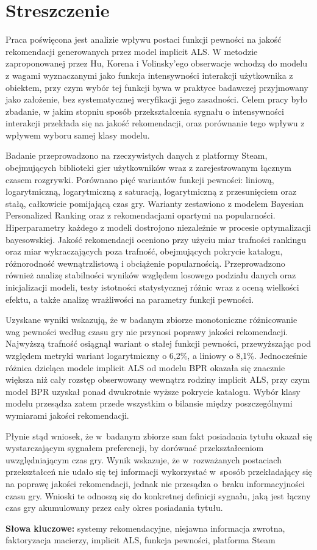 \chapter*{Streszczenie}

Praca poświęcona jest analizie wpływu postaci funkcji pewności na jakość rekomendacji generowanych przez model implicit ALS. W metodzie zaproponowanej przez Hu, Korena i Volinsky'ego obserwacje wchodzą do modelu z wagami wyznaczanymi jako funkcja intensywności interakcji użytkownika z obiektem, przy czym wybór tej funkcji bywa w praktyce badawczej przyjmowany jako założenie, bez systematycznej weryfikacji jego zasadności. Celem pracy było zbadanie, w jakim stopniu sposób przekształcenia sygnału o intensywności interakcji przekłada się na jakość rekomendacji, oraz porównanie tego wpływu z wpływem wyboru samej klasy modelu.

Badanie przeprowadzono na rzeczywistych danych z platformy Steam, obejmujących biblioteki gier użytkowników wraz z zarejestrowanym łącznym czasem rozgrywki. Porównano pięć wariantów funkcji pewności: liniową, logarytmiczną, logarytmiczną z saturacją, logarytmiczną z przesunięciem oraz stałą, całkowicie pomijającą czas gry. Warianty zestawiono z modelem Bayesian Personalized Ranking oraz z rekomendacjami opartymi na popularności. Hiperparametry każdego z modeli dostrojono niezależnie w procesie optymalizacji bayesowskiej. Jakość rekomendacji oceniono przy użyciu miar trafności rankingu oraz miar wykraczających poza trafność, obejmujących pokrycie katalogu, różnorodność wewnątrzlistową i obciążenie popularnością. Przeprowadzono również analizę stabilności wyników względem losowego podziału danych oraz inicjalizacji modeli, testy istotności statystycznej różnic wraz z oceną wielkości efektu, a także analizę wrażliwości na parametry funkcji pewności.

Uzyskane wyniki wskazują, że w badanym zbiorze monotoniczne różnicowanie wag pewności według czasu gry nie przynosi poprawy jakości rekomendacji. Najwyższą trafność osiągnął wariant o stałej funkcji pewności, przewyższając pod względem metryki \ndcg{} wariant logarytmiczny o 6,2\%, a liniowy o 8,1\%. Jednocześnie różnica dzieląca modele implicit ALS od modelu BPR okazała się znacznie większa niż cały rozstęp obserwowany wewnątrz rodziny implicit ALS, przy czym model BPR uzyskał ponad dwukrotnie wyższe pokrycie katalogu. Wybór klasy modelu przesądza zatem przede wszystkim o bilansie między poszczególnymi wymiarami jakości rekomendacji.

Płynie stąd wniosek, że w~badanym zbiorze sam fakt posiadania tytułu okazał się wystarczającym sygnałem preferencji, by dorównać przekształceniom uwzględniającym czas gry. Wynik wskazuje, że w~rozważanych postaciach przekształceń nie udało się tej informacji wykorzystać w~sposób przekładający się na poprawę jakości rekomendacji, jednak nie przesądza o~braku informacyjności czasu gry. Wnioski te odnoszą się do konkretnej definicji sygnału, jaką jest łączny czas gry akumulowany przez cały okres posiadania tytułu.

\vspace{1em}
\noindent\textbf{Słowa kluczowe:} systemy rekomendacyjne, niejawna informacja zwrotna, faktoryzacja macierzy, implicit ALS, funkcja pewności, platforma Steam